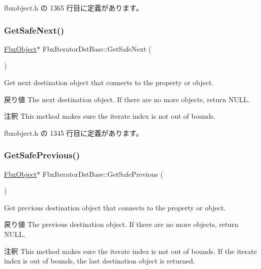  fbxobject.\+h の 1365 行目に定義があります。

\mbox{\label{class_fbx_iterator_dst_base_a2107573dd3869f094ca35931ffc4b790}} 
\subsubsection{\texorpdfstring{Get\+Safe\+Next()}{GetSafeNext()}}
{\footnotesize\ttfamily \hyperlink{class_fbx_object}{Fbx\+Object}$\ast$ Fbx\+Iterator\+Dst\+Base\+::\+Get\+Safe\+Next (\begin{DoxyParamCaption}{ }\end{DoxyParamCaption})\hspace{0.3cm}{\ttfamily [inline]}}

Get next destination object that connects to the property or object. \begin{DoxyReturn}{戻り値}
The next destination object. If there are no more objects, return N\+U\+LL. 
\end{DoxyReturn}
\begin{DoxyRemark}{注釈}
This method makes sure the iterate index is not out of bounds. 
\end{DoxyRemark}


 fbxobject.\+h の 1345 行目に定義があります。

\mbox{\label{class_fbx_iterator_dst_base_af5526eefa90ef43e1a0daff1b8e8e3d3}} 
\subsubsection{\texorpdfstring{Get\+Safe\+Previous()}{GetSafePrevious()}}
{\footnotesize\ttfamily \hyperlink{class_fbx_object}{Fbx\+Object}$\ast$ Fbx\+Iterator\+Dst\+Base\+::\+Get\+Safe\+Previous (\begin{DoxyParamCaption}{ }\end{DoxyParamCaption})\hspace{0.3cm}{\ttfamily [inline]}}

Get previous destination object that connects to the property or object. \begin{DoxyReturn}{戻り値}
The previous destination object. If there are no more objects, return N\+U\+LL. 
\end{DoxyReturn}
\begin{DoxyRemark}{注釈}
This method makes sure the iterate index is not out of bounds. If the iterate index is out of bounds, the last destination object is returned. 
\end{DoxyRemark}


